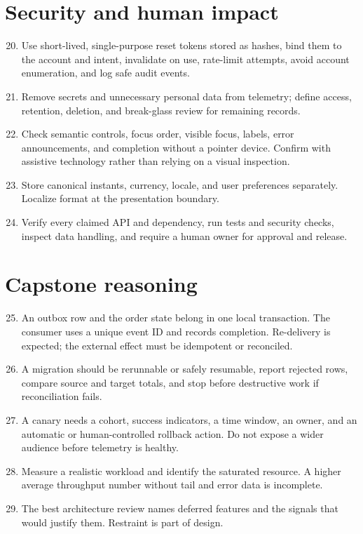 \section{Security and human impact}
\begin{enumerate}
  \setcounter{enumi}{19}
  \item Use short-lived, single-purpose reset tokens stored as hashes, bind them
        to the account and intent, invalidate on use, rate-limit attempts, avoid
        account enumeration, and log safe audit events.
  \item Remove secrets and unnecessary personal data from telemetry; define access,
        retention, deletion, and break-glass review for remaining records.
  \item Check semantic controls, focus order, visible focus, labels, error
        announcements, and completion without a pointer device. Confirm with
        assistive technology rather than relying on a visual inspection.
  \item Store canonical instants, currency, locale, and user preferences
        separately. Localize format at the presentation boundary.
  \item Verify every claimed API and dependency, run tests and security checks,
        inspect data handling, and require a human owner for approval and release.
\end{enumerate}

\section{Capstone reasoning}
\begin{enumerate}
  \setcounter{enumi}{24}
  \item An outbox row and the order state belong in one local transaction. The
        consumer uses a unique event ID and records completion. Re-delivery is
        expected; the external effect must be idempotent or reconciled.
  \item A migration should be rerunnable or safely resumable, report rejected
        rows, compare source and target totals, and stop before destructive work
        if reconciliation fails.
  \item A canary needs a cohort, success indicators, a time window, an owner,
        and an automatic or human-controlled rollback action. Do not expose a
        wider audience before telemetry is healthy.
  \item Measure a realistic workload and identify the saturated resource. A
        higher average throughput number without tail and error data is incomplete.
  \item The best architecture review names deferred features and the signals that
        would justify them. Restraint is part of design.
\end{enumerate}

